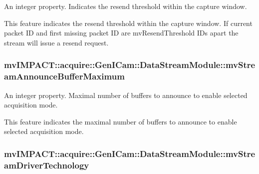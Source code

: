 An integer property. Indicates the resend threshold within the capture window. 

This feature indicates the resend threshold within the capture window. If current packet I\+D and first missing packet I\+D are mv\+Resend\+Threshold I\+Ds apart the stream will issue a resend request. \hypertarget{classmv_i_m_p_a_c_t_1_1acquire_1_1_gen_i_cam_1_1_data_stream_module_acf7cc30058bb28b05c725ba0a2657617}{
\subsubsection[{mv\+Stream\+Announce\+Buffer\+Maximum}]{ mv\+I\+M\+P\+A\+C\+T\+::acquire\+::\+Gen\+I\+Cam\+::\+Data\+Stream\+Module\+::mv\+Stream\+Announce\+Buffer\+Maximum}}\label{classmv_i_m_p_a_c_t_1_1acquire_1_1_gen_i_cam_1_1_data_stream_module_acf7cc30058bb28b05c725ba0a2657617}


An integer property. Maximal number of buffers to announce to enable selected acquisition mode. 

This feature indicates the maximal number of buffers to announce to enable selected acquisition mode. \hypertarget{classmv_i_m_p_a_c_t_1_1acquire_1_1_gen_i_cam_1_1_data_stream_module_a9ab64bbfd598bf9d8f0fb6859ecb3e45}{
\subsubsection[{mv\+Stream\+Driver\+Technology}]{ mv\+I\+M\+P\+A\+C\+T\+::acquire\+::\+Gen\+I\+Cam\+::\+Data\+Stream\+Module\+::mv\+Stream\+Driver\+Technology}}\label{classmv_i_m_p_a_c_t_1_1acquire_1_1_gen_i_cam_1_1_data_stream_module_a9ab64bbfd598bf9d8f0fb6859ecb3e45}


